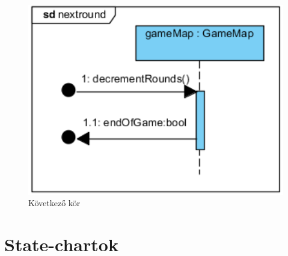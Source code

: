 \begin{figure}[!htbp]
	\begin{center}
		\includegraphics[width=166mm, center]{./vegleges_statikus_seq/nextround.png}
		\caption{Következő kör}
	\end{center}
\end{figure}

\section{State-chartok}


\begin{figure}[h]
\begin{center}
\label{fig:example3}
\end{center}
\end{figure}

